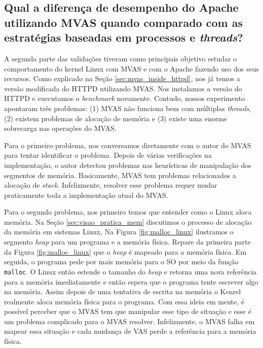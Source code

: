 \subsection{Qual a diferença de desempenho do Apache utilizando MVAS quando
comparado com as estratégias baseadas em processos e \emph{threads}?}

A segunda parte das validações tiveram como principais objetivo estudar o
comportamento do kernel Linux com MVAS e com o Apache fazendo uso dos seus
recursos. Como explicado na Seção \ref{sec:mvas_inside_httpd}, nos já temos a
versão modificada do HTTPD utilizando MVAS. Nos instalamos a versão do HTTPD e
executamos o \emph{benchmark} novamente. Contudo, nossos experimento apontaram
três problemas: (1) MVAS não funciona bem com múltiplas \emph{threads}, (2)
existem problemas de alocação de memória e (3) existe uma enorme sobrecarga nas
operações do MVAS.

Para o primeiro problema, nos conversamos diretamente com o autor do MVAS para
tentar identificar o problema. Depois de várias verificações na implementação,
o autor detectou problemas nas heurísticas de manipulação dos segmentos de
memória.  Basicamente, MVAS tem problemas relacionados a alocação de
\emph{stack}.  Infelizmente, resolver esse problema requer mudar praticamente
toda a implementação atual do MVAS.


Para o segundo problema, nos primeiro temos que entender como o Linux aloca
memória. Na Seção \ref{sec:visao_pratica_mem} discutimos o processo de alocação
da memória em sistemas Linux, Na Figura \ref{fig:malloc_linux} ilustramos o
segmento \emph{heap} para um programa e a memória física. Repare da primeira
parte da Figura \ref{fig:malloc_linux} que o \emph{heap} é mapeado para a
memória física. Em seguida, o programa pede por mais memória para o SO por meio
da função \texttt{malloc}. O Linux então estende o tamanho do \emph{heap} e
retorna uma nova referência para a memória imediatamente e então espera que o
programa tente escrever algo na memória. Assim depois de uma tentativa de
escrita na memória o Kenrel realmente aloca memória física para o programa. Com
essa ideia em mente, é possível perceber que o MVAS tem que manipular esse tipo
de situação e esse é um problema complicado para o MVAS resolver. Infelizmente,
o MVAS falha em mapear essa situação e cada mudança de VAS perde a referência
para a memória física.


